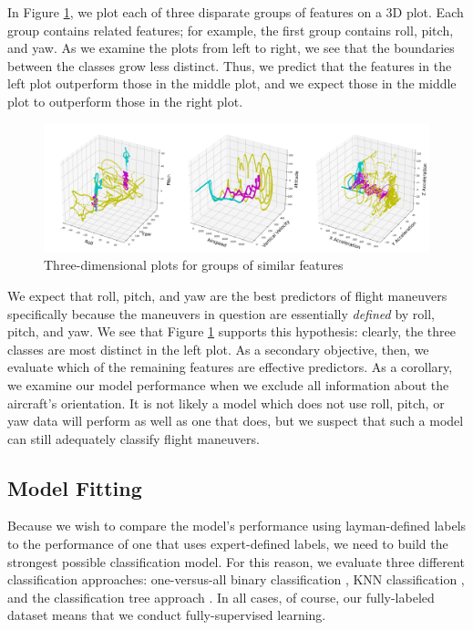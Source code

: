 \documentclass[11pt]{article}
\begin{document}
In Figure \ref{fig:3d-plots}, we plot each of three disparate groups of features on a \ac{3D} plot. Each group contains related features; for example, the first group contains roll, pitch, and yaw. As we examine the plots from left to right, we see that the boundaries between the classes grow less distinct. Thus, we predict that the features in the left plot outperform those in the middle plot, and we expect those in the middle plot to outperform those in the right plot.

\begin{figure}[ht]
    \centering
    \includegraphics[scale=0.3]{3d-plots.png}
    \caption{Three-dimensional plots for groups of similar features}
    \label{fig:3d-plots}
\end{figure}


We expect that roll, pitch, and yaw are the best predictors of flight maneuvers specifically because the maneuvers in question are essentially \textit{defined} by roll, pitch, and yaw. We see that Figure \ref{fig:3d-plots} supports this hypothesis: clearly, the three classes are most distinct in the left plot. As a secondary objective, then, we evaluate which of the remaining features are effective predictors. As a corollary, we examine our model performance when we exclude all information about the aircraft's orientation. It is not likely a model which does not use roll, pitch, or yaw data will perform as well as one that does, but we suspect that such a model can still adequately classify flight maneuvers.

\subsection{Model Fitting}


Because we wish to compare the model's performance using layman-defined labels to the performance of one that uses expert-defined labels, we need to build the strongest possible classification model. For this reason, we evaluate three different classification approaches: one-versus-all binary classification \cite{James2013, Bishop2006}, \ac{KNN} classification \cite{James2013}, and the classification tree approach \cite{James2013}. In all cases, of course, our fully-labeled dataset means that we conduct fully-supervised learning.
\end{document}
